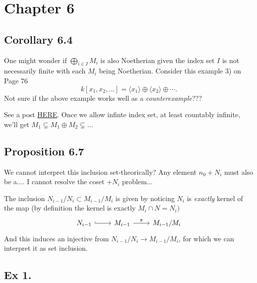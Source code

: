 \section{Chapter 6}

\subsection{Corollary 6.4}

One might wonder if $\bigoplus_{i\in I}M_i$ is also Noetherian given the index set $I$ is not necessarily finite with each $M_i$ being Noetherian. 
Consider this example 3) on Page 76
$$k[x_1,x_2,...]=\langle x_1\rangle \oplus\langle x_2\rangle\oplus\cdots.$$
Not sure if the above example works well as a \textit{counterexample}???

See a post \href{https://math.stackexchange.com/questions/173614/question-about-direct-sum-of-noetherian-modules-is-noetherian}{HERE}. 
Once we allow infinte index set, at least countably infinite, we'll get $M_1\subsetneq M_1\oplus M_2\subsetneq...$

\subsection{Proposition 6.7}

We cannot interpret this inclusion set-theorically? Any element $n_{0}+N_i$ must also be a.... I cannot resolve the coset $+N_i$ problem... 

The inclusion $N_{i-1}/N_i\subset M_{i-1}/M_i$ is given by noticing $N_i$ is \textit{exactly} kernel of the map (by definition the kernel is exactly $M_i\cap N=N_{i})$
\[\begin{tikzcd}
	{N_{i-1}} & {M_{i-1}} & {M_{i-1}/M_i}
	\arrow[hook, from=1-1, to=1-2]
	\arrow["\pi", from=1-2, to=1-3]
\end{tikzcd}\]
And this induces an injective from $N_{i-1}/N_i\to M_{i-1}/M_i$, for which we can interpret it as set inclusion.

\subsection{Ex 1.}